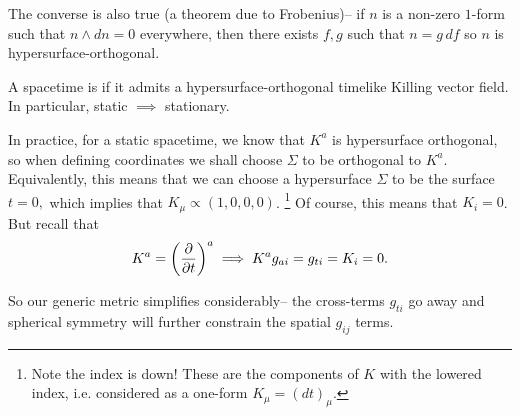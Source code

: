 The converse is also true (a theorem due to Frobenius)-- if $n$ is a non-zero $1$-form such that $n\wedge dn=0$ everywhere, then there exists $f,g$ such that $n=g\, df$ so $n$ is hypersurface-orthogonal.

\begin{defn}
    A spacetime is  if it admits a hypersurface-orthogonal timelike Killing vector field. In particular, static $\implies$ stationary.
\end{defn}

In practice, for a static spacetime, we know that $K^a$ is hypersurface orthogonal, so when defining coordinates we shall choose $\Sigma$ to be orthogonal to $K^a$. Equivalently, this means that we can choose a hypersurface $\Sigma$ to be the surface $t=0,$ which implies that $K_\mu \propto (1,0,0,0)$.%
    \footnote{Note the index is down! These are the components of $K$ with the lowered index, i.e. considered as a one-form $K_\mu=(dt)_\mu$.}
Of course, this means that $K_i=0$. But recall that
\begin{equation*}
    K^a= \left(\P{}{t}\right)^a \implies K^a g_{ai}=g_{ti}=K_i=0.
\end{equation*}

So our generic metric simplifies considerably-- the cross-terms $g_{ti}$ go away and spherical symmetry will further constrain the spatial $g_{ij}$ terms.